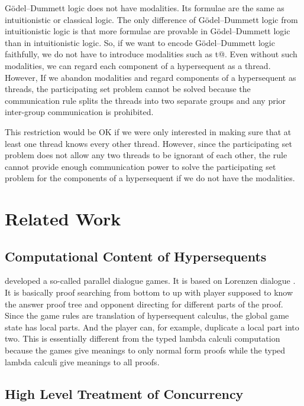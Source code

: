 G\"odel--Dummett logic does not have modalities.  Its formulae are the
same as intuitionistic or classical logic.  The only difference of
G\"odel--Dummett logic from intuitionistic logic is that more formulae
are provable in G\"odel--Dummett
logic than in intuitionistic logic.  So, if we want to encode G\"odel--Dummett
logic faithfully, we do not have to introduce modalities such as \verb@K t@.
Even without such modalities, we can regard each component of a
hypersequent as a thread. However,
If we abandon modalities and regard components of a hypersequent as
threads, the participating set problem cannot be solved because the communication rule
splits the threads into two separate groups and any prior
inter-group communication is prohibited.

This restriction would be OK if we were only interested in making sure that
at least one thread knows every other thread.  However, since the
participating set problem does not allow any two threads to be ignorant
of each other, the \verb@comm@ rule cannot provide enough communication power
to solve the participating set problem for the components of a
hypersequent if we do not have the modalities.

\section{Related Work}

\subsection{Computational Content of Hypersequents}


\citet{parallel} developed a so-called parallel dialogue games.  It is
based on Lorenzen dialogue .  It is basically proof searching from
bottom to up with player supposed
to know the answer proof tree and opponent directing for different parts
of the proof.  Since the game rules are translation of hypersequent
calculus, the global game state has local parts.  And the player can,
for example, duplicate a local part into two.  This is essentially
different from the typed lambda calculi computation because the games
give meanings to only normal form proofs while the typed lambda calculi
give meanings to all proofs.

\subsection{High Level Treatment of Concurrency}

